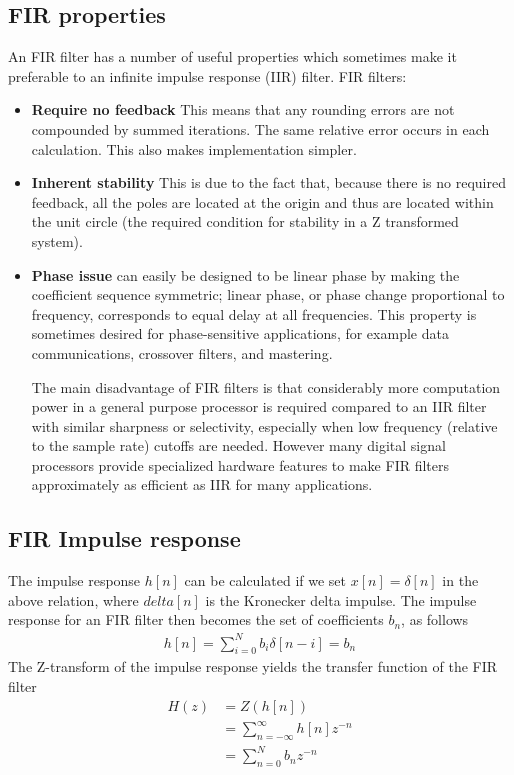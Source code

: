 \documentclass[conference]{IEEEtran}
\begin{document}
\subsection{FIR properties}
An FIR filter has a number of useful properties which sometimes make it preferable to an infinite impulse response (IIR) filter. FIR filters:
\begin{itemize}
\item\textbf{Require no feedback} This means that any rounding errors are not compounded by summed iterations. The same relative error occurs in each calculation. This also makes implementation simpler.
\item\textbf{Inherent stability} This is due to the fact that, because there is no required feedback, all
the poles are located at the origin and thus are located within the unit circle (the required condition for stability in a Z transformed system).
\item\textbf{Phase issue} can easily be designed to be linear phase by making the coefficient sequence symmetric; linear phase, or phase change proportional to frequency, corresponds to equal delay at all frequencies. This property is sometimes desired for phase-sensitive applications, for example data communications, crossover filters, and mastering.

The main disadvantage of FIR filters is that considerably more computation power in a general purpose processor is required compared to an IIR filter with similar sharpness or selectivity, especially when low frequency (relative to the sample rate) cutoffs are needed. However many digital signal processors provide specialized hardware features to make FIR filters approximately as efficient as IIR for many applications.
\end{itemize}

\subsection{FIR Impulse response}
The impulse response $h[n]$ can be calculated if we set $x[n] = \delta[n]$ in the above relation, where $delta[n]$ is the Kronecker delta impulse. The impulse response for an FIR filter then becomes the set of coefficients $b_n$, as follows
\begin{align}
h[n] = \sum_{i=0}^{N}b_i\delta[n-i] = b_n
\end{align}
The Z-transform of the impulse response yields the transfer function of the FIR filter
\begin{align}
H(z) &= Z(h[n])\\
	 &= \sum_{n=-\infty}^{\infty}h[n]z^{-n}\\
	 &= \sum_{n=0}^{N}b_nz^{-n}
\end{align}\\
\end{document}
